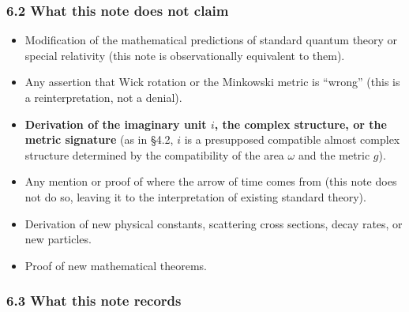 \documentclass[
]{article}
\providecommand{\tightlist}{%
  \setlength{\itemsep}{0pt}\setlength{\parskip}{0pt}}
\begin{document}
\subsubsection{6.2 What this note does not
claim}\label{what-this-note-does-not-claim}

\begin{itemize}
\tightlist
\item
  Modification of the mathematical predictions of standard quantum
  theory or special relativity (this note is observationally equivalent
  to them).
\item
  Any assertion that Wick rotation or the Minkowski metric is ``wrong''
  (this is a reinterpretation, not a denial).
\item
  \textbf{Derivation of the imaginary unit \(i\), the complex structure,
  or the metric signature} (as in §4.2, \(i\) is a presupposed
  compatible almost complex structure determined by the compatibility of
  the area \(\omega\) and the metric \(g\)).
\item
  Any mention or proof of where the arrow of time comes from (this note
  does not do so, leaving it to the interpretation of existing standard
  theory).
\item
  Derivation of new physical constants, scattering cross sections, decay
  rates, or new particles.
\item
  Proof of new mathematical theorems.
\end{itemize}

\subsubsection{6.3 What this note records}\label{what-this-note-records}
\end{document}
